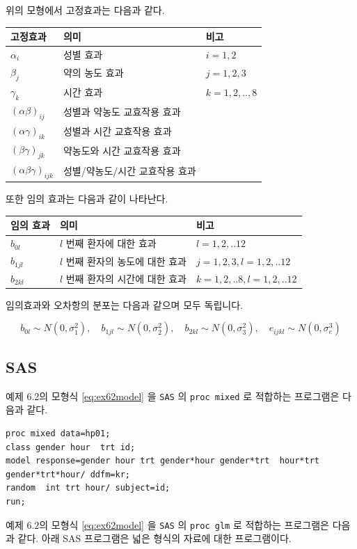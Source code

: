 \documentclass[
]{book}
\theoremstyle{definition}
\theoremstyle{definition}
\theoremstyle{definition}
\theoremstyle{remark}
\begin{document}
위의 모형에서 고정효과는 다음과 같다.

\begin{longtable}[]{@{}lll@{}}
\toprule
고정효과 & 의미 & 비고\tabularnewline
\midrule
\endhead
\(\alpha_i\) & 성별 효과 & \(i=1,2\)\tabularnewline
\(\beta_j\) & 약의 농도 효과 & \(j=1,2,3\)\tabularnewline
\(\gamma_k\) & 시간 효과 & \(k=1,2,..,8\)\tabularnewline
\((\alpha \beta)_{ij}\) & 성별과 약농도 교효작용 효과 &\tabularnewline
\((\alpha \gamma)_{ik}\) & 성별과 시간 교효작용 효과 &\tabularnewline
\((\beta \gamma)_{jk}\) & 약농도와 시간 교효작용 효과 &\tabularnewline
\((\alpha \beta \gamma)_{ijk}\) & 성별/약농도/시간 교효작용 효과 &\tabularnewline
\bottomrule
\end{longtable}

또한 임의 효과는 다음과 같이 나타난다.

\begin{longtable}[]{@{}lll@{}}
\toprule
임의 효과 & 의미 & 비고\tabularnewline
\midrule
\endhead
\(b_{0l}\) & \(l\) 번째 환자에 대한 효과 & \(l=1,2,..12\)\tabularnewline
\(b_{1jl}\) & \(l\) 번째 환자의 농도에 대한 효과 & \(j=1,2,3, l=1,2,..12\)\tabularnewline
\(b_{2kl}\) & \(l\) 번째 환자의 시간에 대한 효과 & \(k=1,2,..8,l=1,2,..12\)\tabularnewline
\bottomrule
\end{longtable}

임의효과와 오차항의 분포는 다음과 같으며 모두 독립니다.

\begin{equation}
b_{0l} \sim N(0, \sigma_1^2), \quad 
b_{1jl} \sim N(0, \sigma_2^2), \quad
b_{2kl} \sim N(0, \sigma_3^2), \quad
e_{ijkl} \sim N(0, \sigma_e^3)
\label{eq:ex62random}
\end{equation}

\hypertarget{sas}{%
\subsection{SAS}\label{sas}}

예제 6.2의 모형식 \eqref{eq:ex62model} 을 \texttt{SAS} 의 \texttt{proc\ mixed} 로 적합하는 프로그램은 다음과 같다.

\begin{verbatim}
proc mixed data=hp01;
class gender hour  trt id;
model response=gender hour trt gender*hour gender*trt  hour*trt  gender*trt*hour/ ddfm=kr;
random  int trt hour/ subject=id;
run;
\end{verbatim}

예제 6.2의 모형식 \eqref{eq:ex62model} 을 \texttt{SAS} 의 \texttt{proc\ glm} 로 적합하는 프로그램은 다음과 같다.
아래 SAS 프로그램은 넓은 형식의 자료에 대한 프로그램이다.
\end{document}
